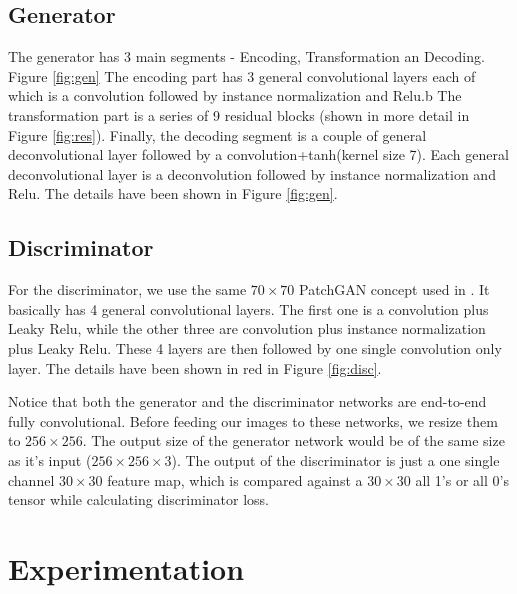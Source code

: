 \documentclass[10pt,twocolumn,letterpaper]{article}
\begin{document}
\subsection{Generator}
The generator has 3 main segments - Encoding, Transformation an Decoding. Figure 
\ref{fig:gen} The encoding part has 3 general convolutional
layers each of which is a convolution followed by instance normalization \cite{cyclegan} and Relu.b The transformation part is a series of 9 residual 
blocks (shown in more detail in Figure \ref{fig:res}). Finally, the decoding segment is a couple of general deconvolutional layer followed by a convolution+tanh(kernel size 7). Each general deconvolutional layer is a deconvolution followed by instance normalization and Relu. The details have been shown in Figure \ref{fig:gen}.

\subsection{Discriminator}
For the discriminator, we use the same $70 \times 70$ PatchGAN concept used in \cite{cyclegan}.
It basically has 4 general convolutional layers. The first one is a convolution plus Leaky Relu, while the other three are convolution plus instance normalization plus Leaky Relu. These 4 layers are then followed by one single 
convolution only layer. The details have been shown in red in Figure \ref{fig:disc}.

Notice that both the generator and the discriminator networks are end-to-end fully convolutional. Before 
feeding our images to these networks, we resize them to $256 \times 256$. The output size of the generator network would be of the same size as it's input ($256 \times 256 \times 3$). The output of the 
discriminator is just a one single channel $30 \times 30$ feature map, which is compared against a $30 \times 30$ all 1's or all 0's tensor while calculating discriminator loss.

\section{Experimentation}
\end{document}
